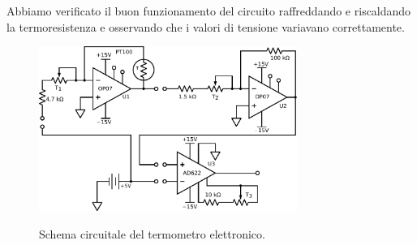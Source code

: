 Abbiamo verificato il buon funzionamento del circuito raffreddando e riscaldando la termoresistenza e osservando che i valori di tensione variavano correttamente.

\begin{figure}[ht]
 \centering
   {\includegraphics[width=0.75\textwidth]{../E06/latex/c1.pdf}}
 \caption{Schema circuitale del termometro elettronico.}
 \label{cir6:term}
\end{figure}
